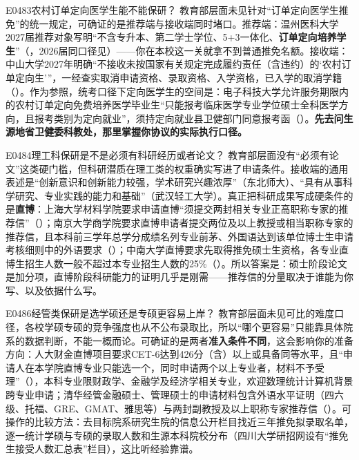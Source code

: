 \begin{qa}{E0483}{农村订单定向医学生能不能保研？}
教育部层面未见针对“订单定向医学生推免”的统一规定，可确证的是推荐端与接收端同时堵口。推荐端：温州医科大学2027届推荐对象写明“不含专升本、第二学士学位、5+3一体化、\textbf{订单定向培养学生}”（，2026届同口径见）——你在本校这一关就拿不到普通推免名额。接收端：中山大学2027年明确“不接收未按国家有关规定完成履约责任（含违约）的‘农村订单定向生’”，一经查实取消申请资格、录取资格、入学资格，已入学的取消学籍（）。作为参照，统考口径下定向医学生的空间是：电子科技大学允许服务期限内的农村订单定向免费培养医学毕业生“只能报考临床医学专业学位硕士全科医学方向，且报考类别为定向就业”，须持定向就业县卫健部门同意报考函（）。\textbf{先去问生源地省卫健委科教处，那里掌握你协议的实际执行口径。}
\end{qa}

\begin{qa}{E0484}{理工科保研是不是必须有科研经历或者论文？}
教育部层面没有“必须有论文”这类硬门槛，但科研潜质在理工类的权重确实写进了申请条件。接收端的通用表述是“创新意识和创新能力较强，学术研究兴趣浓厚”（东北师大）、“具有从事科学研究、专业实践的能力和基础”（武汉轻工大学）。真正把科研成果写成硬条件的是\textbf{直博}：上海大学材料学院要求申请直博“须提交两封相关专业正高职称专家的推荐信”（）；南京大学商学院要求直博申请者提交两位及以上教授或相当职称专家的推荐信，且本科前三学年总学分成绩名列专业前茅、外国语达到该单位博士生申请考核细则中的外语要求（）；中南大学直博要求先取得推免硕士生资格，各专业直博生招生人数一般不超过本专业招生人数的25\%（）。所以答案是：硕士阶段论文是加分项，直博阶段科研能力的证明几乎是刚需——推荐信的分量取决于谁能为你写、以及依据什么写。
\end{qa}

\begin{qa}{E0486}{经管类保研是选学硕还是专硕更容易上岸？}
教育部层面未见可比的难度口径，各校学硕专硕的竞争强度也从不公布录取比，所以“哪个更容易”只能靠具体院系的数据判断，不能一概而论。可确证的是两者\textbf{准入条件不同}，这会影响你的准备方向：人大财金直博项目要求CET-6达到426分（含）以上或具备同等水平，且“申请人在本学院直博专业只能选一个，同时申请两个以上专业者，材料不予受理”（），本科专业限财政学、金融学及经济学相关专业，欢迎数理统计计算机背景跨专业申请；清华经管金融硕士、管理硕士的申请材料包含外语水平证明（四六级、托福、GRE、GMAT、雅思等）与两封副教授及以上职称专家推荐信（）。可操作的比较方法：去目标院系研究生院的信息公开栏目找近三年推免拟录取名单，逐一统计学硕与专硕的录取人数和生源本科院校分布（四川大学研招网设有“推免生接受人数汇总表”栏目），这比听经验靠谱。
\end{qa}

